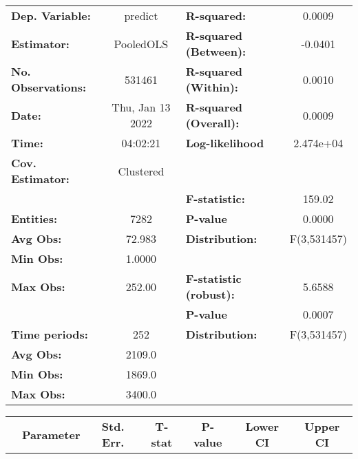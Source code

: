\begin{center}
\begin{tabular}{lclc}
\toprule
\textbf{Dep. Variable:}    &      predict       & \textbf{  R-squared:         }   &      0.0009      \\
\textbf{Estimator:}        &     PooledOLS      & \textbf{  R-squared (Between):}  &     -0.0401      \\
\textbf{No. Observations:} &       531461       & \textbf{  R-squared (Within):}   &      0.0010      \\
\textbf{Date:}             &  Thu, Jan 13 2022  & \textbf{  R-squared (Overall):}  &      0.0009      \\
\textbf{Time:}             &      04:02:21      & \textbf{  Log-likelihood     }   &    2.474e+04     \\
\textbf{Cov. Estimator:}   &     Clustered      & \textbf{                     }   &                  \\
\textbf{}                  &                    & \textbf{  F-statistic:       }   &      159.02      \\
\textbf{Entities:}         &        7282        & \textbf{  P-value            }   &      0.0000      \\
\textbf{Avg Obs:}          &       72.983       & \textbf{  Distribution:      }   &   F(3,531457)    \\
\textbf{Min Obs:}          &       1.0000       & \textbf{                     }   &                  \\
\textbf{Max Obs:}          &       252.00       & \textbf{  F-statistic (robust):} &      5.6588      \\
\textbf{}                  &                    & \textbf{  P-value            }   &      0.0007      \\
\textbf{Time periods:}     &        252         & \textbf{  Distribution:      }   &   F(3,531457)    \\
\textbf{Avg Obs:}          &       2109.0       & \textbf{                     }   &                  \\
\textbf{Min Obs:}          &       1869.0       & \textbf{                     }   &                  \\
\textbf{Max Obs:}          &       3400.0       & \textbf{                     }   &                  \\
\bottomrule
\end{tabular}
\begin{tabular}{lcccccc}
                & \textbf{Parameter} & \textbf{Std. Err.} & \textbf{T-stat} & \textbf{P-value} & \textbf{Lower CI} & \textbf{Upper CI}  \\

\end{tabular}
\end{center}
